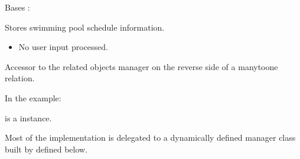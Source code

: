 \documentclass[letterpaper,10pt,french]{sphinxmanual}
\begin{document}
\begin{fulllineitems}
\label{\detokenize{index:core.models.SwimmingPoolInfo}}
\pysigstartsignatures
\pysiglinewithargsret
{}
{\sphinxparamcomma {}}
{}
\pysigstopsignatures
\sphinxAtStartPar
Bases : 

\sphinxAtStartPar
Stores swimming pool schedule information.
\begin{description}
\begin{itemize}
\item {} 
\sphinxAtStartPar
No user input processed.

\end{itemize}

\end{description}

\begin{fulllineitems}
\label{\detokenize{index:core.models.SwimmingPoolInfo.translations}}
\pysigstartsignatures
\pysigline
{}
\pysigstopsignatures
\sphinxAtStartPar
Accessor to the related objects manager on the reverse side of a
many\sphinxhyphen{}to\sphinxhyphen{}one relation.

\sphinxAtStartPar
In the example:

\begin{sphinxVerbatim}[commandchars=\\\{\}]
       
\end{sphinxVerbatim}

\sphinxAtStartPar
{} is a  instance.

\sphinxAtStartPar
Most of the implementation is delegated to a dynamically defined manager
class built by  defined below.


\end{fulllineitems}
\end{fulllineitems}
\end{document}
